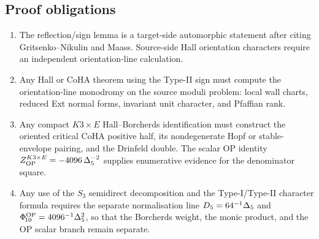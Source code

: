 \subsection*{Proof obligations}

\begin{enumerate}
\item The reflection/sign lemma is a target-side automorphic statement
after citing Gritsenko--Nikulin and Maass. Source-side Hall orientation
characters require an independent orientation-line calculation.
\item Any Hall or CoHA theorem using the Type-II sign must compute the
orientation-line monodromy on the source moduli problem: local wall
charts, reduced Ext normal forms, invariant unit character, and
Pfaffian rank.
\item Any compact $K3\times E$ Hall--Borcherds identification must
construct the oriented critical CoHA positive half, its nondegenerate
Hopf or stable-envelope pairing, and the Drinfeld double. The scalar
OP identity $Z^{K3\times E}_{\mathrm{OP}}=-4096\,\Delta_{5}^{-2}$ supplies
enumerative evidence for the denominator square.
\item Any use of the $S_3$ semidirect decomposition and the
Type-I/Type-II character formula requires the separate normalisation line
$D_5=64^{-1}\Delta_{5}$ and
$\Phi_{\!10}^{\mathrm{OP}}=4096^{-1}\Delta_{5}^2$, so that the Borcherds
weight, the monic product, and the OP scalar branch remain separate.
\end{enumerate}
